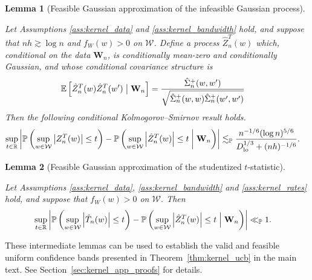 \documentclass[11pt,lof]{puthesis}
\renewcommand{\P}{\ensuremath{\mathbb{P}}}
\newcommand{\R}{\ensuremath{\mathbb{R}}}
\newcommand{\E}{\ensuremath{\mathbb{E}}}
\newcommand{\bW}{\ensuremath{\mathbf{W}}}
\newcommand{\cW}{\ensuremath{\mathcal{W}}}
\newcommand{\Dl}{\ensuremath{D_{\textup{lo}}}}
\theoremstyle{break}
\newtheorem{lemma}{Lemma}[section]
\theoremstyle{proof}
\begin{document}
\begin{lemma}[Feasible Gaussian approximation
  of the infeasible Gaussian process]
  \label{lem:kernel_app_distributional_approx_feasible_gaussian}

  Let Assumptions \ref{ass:kernel_data} and \ref{ass:kernel_bandwidth}
  hold, and suppose that
  $n h \gtrsim \log n$ and $f_W(w) > 0$ on $\cW$.
  Define a process $\hat Z_n^T(w)$ which,
  conditional on the data $\bW_n$,
  is conditionally mean-zero and
  conditionally Gaussian, and whose
  conditional covariance structure is
  \begin{align*}
    \E\left[
      \hat Z_n^T(w) \hat Z_n^T(w')
    \bigm| \bW_n \right]
    &=
    \frac{\hat \Sigma_n^+(w,w')}
    {\sqrt{\hat \Sigma_n^+(w,w) \hat \Sigma_n^+(w',w')}}
  \end{align*}
  Then the following conditional
  Kolmogorov--Smirnov result holds.
  \begin{align*}
    \sup_{t \in \R}
    \left|
      \P\left(
        \sup_{w \in \cW}
        \left| Z_n^T(w) \right|
        \leq t
      \right)
      - \P\left(
        \sup_{w \in \cW}
        \left| \hat Z_n^T(w) \right|
        \leq t
        \biggm\vert \bW_n
      \right)
    \right|
    &\lesssim_\P
    \frac{n^{-1/6}(\log n)^{5/6}}
    {\Dl^{1/3} + (n h)^{-1/6}}.
  \end{align*}

\end{lemma}

\begin{lemma}[Feasible Gaussian approximation of the studentized $t$-statistic]
  \label{lem:kernel_app_feasible_gaussian_approx}

  Let Assumptions \ref{ass:kernel_data}, \ref{ass:kernel_bandwidth}
  and \ref{ass:kernel_rates} hold, and suppose that $f_W(w) > 0$ on $\cW$.
  Then
  \begin{align*}
    \sup_{t \in \R}
    \left|
      \P\left(
        \sup_{w \in \cW}
        \left| \hat T_n(w) \right|
        \leq t
      \right)
      - \P\left(
        \sup_{w \in \cW}
        \left| \hat Z_n^T(w) \right|
        \leq t
        \Bigm\vert \bW_n
      \right)
    \right|
    &\ll_\P
    1.
  \end{align*}

\end{lemma}

These intermediate lemmas can be used to establish the valid and feasible
uniform confidence bands presented in Theorem~\ref{thm:kernel_ucb} in the main
text. See Section~\ref{sec:kernel_app_proofs} for details.
\end{document}

